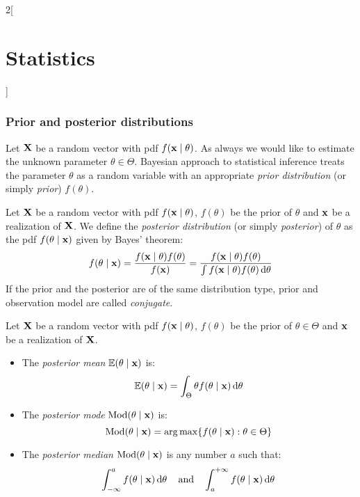 \documentclass[../../../main.tex]{subfiles}
\begin{document}
\begin{multicols}{2}[\section{Statistics}]
  \subsubsection{Prior and posterior distributions}
  \begin{definition}
    Let $\boldsymbol{\mathrm{X}}$ be a random vector with pdf $f(\boldsymbol{\mathrm{x}}\mid \theta)$. As always we would like to estimate the unknown parameter $\theta\in\Theta$. Bayesian approach to statistical inference treats the parameter $\theta$ as a random variable with an appropriate \emph{prior distribution} (or simply \emph{prior}) $f(\theta)$.
  \end{definition}
  \begin{definition}
    Let $\boldsymbol{\mathrm{X}}$ be a random vector with pdf $f(\boldsymbol{\mathrm{x}}\mid \theta)$, $f(\theta)$ be the prior of $\theta$ and $\boldsymbol{\mathrm{x}}$ be a realization of $\boldsymbol{\mathrm{X}}$. We define the \emph{posterior distribution} (or simply \emph{posterior}) of $\theta$ as the pdf $f(\theta\mid \boldsymbol{\mathrm{x}})$ given by Bayes' theorem: $$f(\theta\mid\boldsymbol{\mathrm{x}})=\frac{f(\boldsymbol{\mathrm{x}}\mid\theta)f(\theta)}{f(\boldsymbol{\mathrm{x}})}=\frac{f(\boldsymbol{\mathrm{x}}\mid\theta)f(\theta)}{\int f(\boldsymbol{\mathrm{x}}\mid\theta)f(\theta)\dd{\theta}}$$
    If the prior and the posterior are of the same distribution type, prior and observation model are called \emph{conjugate}.
  \end{definition}
  \begin{definition}
    Let $\boldsymbol{\mathrm{X}}$ be a random vector with pdf $f(\boldsymbol{\mathrm{x}}\mid \theta)$, $f(\theta)$ be the prior of $\theta\in\Theta$ and $\boldsymbol{\mathrm{x}}$ be a realization of $\boldsymbol{\mathrm{X}}$.
    \begin{itemize}
      \item The \emph{posterior mean} $\mathbb{E}(\theta\mid\boldsymbol{\mathrm{x}})$ is: $$\mathbb{E}(\theta\mid\boldsymbol{\mathrm{x}})=\int_\Theta\theta f(\theta\mid\boldsymbol{\mathrm{x}})\dd{\theta}$$
      \item The \emph{posterior mode} $\operatorname{Mod}(\theta\mid\boldsymbol{\mathrm{x}})$ is: $$\operatorname{Mod}(\theta\mid\boldsymbol{\mathrm{x}})=\operatorname*{arg\,max}\{f(\theta\mid\boldsymbol{\mathrm{x}}) : \theta\in\Theta\}$$
      \item The \emph{posterior median} $\operatorname{Mod}(\theta\mid\boldsymbol{\mathrm{x}})$ is any number $a$ such that: $$\int_{-\infty}^af(\theta\mid\boldsymbol{\mathrm{x}})\dd{\theta}\quad\text{and}\quad\int_a^{+\infty}f(\theta\mid\boldsymbol{\mathrm{x}})\dd{\theta}$$
    \end{itemize}
  \end{definition}

\end{multicols}
\end{document}
